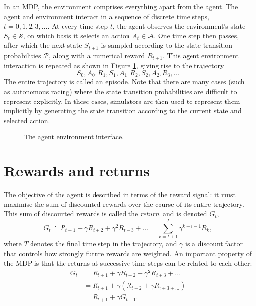 In an MDP, the environment comprises everything apart from the agent.
The agent and environment interact in a sequence of discrete time steps, $t=0,1,2,3, ...$.
At every time step $t$, the agent observes the environment's state $S_t \in \mathcal{S}$, on which basis it selects an action $A_t \in \mathcal{A}$.
One time step then passes, after which the next state $S_{t+1}$ is sampled according to the state transition probabilities $\mathcal{P}$, along with a numerical reward $R_{t+1}$.
This agent environment interaction is repeated as shown in Figure \ref{fig:agent_env_boundary}, giving rise to the trajectory
\begin{equation}
S_0, A_0, R_1, S_1, A_1, R_2, S_2, A_2, R_3, ... 
\label{eq:mdp_trajectory}
\end{equation}
The entire trajectory is called an episode.
Note that there are many cases (such as autonomous racing) where the state transition probabilities are difficult to represent explicitly.
In these cases, simulators are then used to represent them implicitly by generating the state transition according to the current state and selected action.
\begin{figure}[!htb]
\centering

\caption[The agent environment interface]{The agent environment interface.}
\label{fig:agent_env_boundary}
\end{figure}

\section{Rewards and returns}
The objective of the agent is described in terms of the reward signal: it must maximise the sum of discounted rewards over the course of its entire trajectory.
This sum of discounted rewards is called the \emph{return}, and is denoted $G_t$,
\begin{equation}
G_t \doteq R_{t+1} + \gamma R_{t+2} + \gamma^2 R_{t+3} + ... = \sum_{k=t+1}^{T} \gamma^{k-t-1} R_{k},
\label{eq:G_t_discount}
\end{equation}
where $T$ denotes the final time step in the trajectory, and $\gamma$ is a discount factor that controls how strongly future rewards are weighted.
An important property of the MDP is that the returns at successive time steps can be related to each other:
\begin{equation}
\begin{split}
G_t &= R_{t+1} + \gamma R_{t+2} + \gamma^2 R_{t+3} + ... \\
&= R_{t+1} + \gamma (R_{t+2} + \gamma R_{t+3 + ...}) \\
&= R_{t+1} + \gamma G_{t+1}. 
\label{eq:G_t_recursive}
\end{split}
\end{equation}

